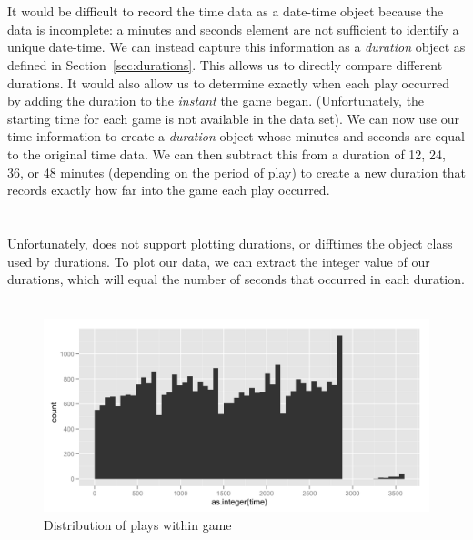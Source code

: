 \documentclass[article]{jss}
\begin{document}
\\
\\

It would be difficult to record the time data as a date-time object because the data is incomplete: a minutes and seconds element are not sufficient to identify a unique date-time. We can instead capture this information as a \emph{duration} object as defined in Section~\ref{sec:durations}. This allows us to directly compare different durations. It would also allow us to determine exactly when each play occurred by adding the duration to the \emph{instant} the game began. (Unfortunately, the starting time for each game is not available in the data set). We can now use our time information to create a \emph{duration} object whose minutes and seconds are equal to the original time data. We can then subtract this from a duration of 12, 24, 36, or 48 minutes (depending on the period of play) to create a new duration that records exactly how far into the game each play occurred.\\

\\
\\

Unfortunately,  does not support plotting durations, or difftimes the object class used by durations. To plot our data, we can extract the integer value of our durations, which will equal the number of seconds that occurred in each duration.\\

\\

\begin{figure}[htpb]
  \centering
  \includegraphics[width=\textwidth]{play-time-histogram.png}        
  \caption{Distribution of plays within game}
  \label{fig:plays}
\end{figure}
\end{document}
